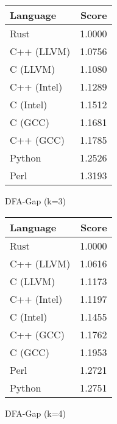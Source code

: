 \begin{subtable}{0.33\textwidth}
    \centering
    \begin{tabular}{|l|r|}
        \hline
        Language & Score \\
        \hline
        Rust & 1.0000 \\
        C++ (LLVM) & 1.0756 \\
        C (LLVM) & 1.1080 \\
        C++ (Intel) & 1.1289 \\
        C (Intel) & 1.1512 \\
        C (GCC) & 1.1681 \\
        C++ (GCC) & 1.1785 \\
        Python & 1.2526 \\
        Perl & 1.3193 \\
        \hline
    \end{tabular}
    \caption{DFA-Gap (k=3)}
    \label{table:energy:dfa_gap(3)}
\end{subtable}%
\begin{subtable}{0.33\textwidth}
    \centering
    \begin{tabular}{|l|r|}
        \hline
        Language & Score \\
        \hline
        Rust & 1.0000 \\
        C++ (LLVM) & 1.0616 \\
        C (LLVM) & 1.1173 \\
        C++ (Intel) & 1.1197 \\
        C (Intel) & 1.1455 \\
        C++ (GCC) & 1.1762 \\
        C (GCC) & 1.1953 \\
        Perl & 1.2721 \\
        Python & 1.2751 \\
        \hline
    \end{tabular}
    \caption{DFA-Gap (k=4)}
    \label{table:energy:dfa_gap(4)}
\end{subtable}%
